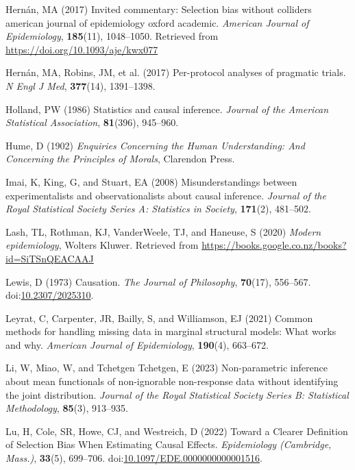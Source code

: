 \documentclass[
  single column]{article}
\newlength{\cslhangindent}
\newenvironment{CSLReferences}[2] %
 {\begin{list}{}{%
  \setlength{\itemindent}{0pt}
  \setlength{\leftmargin}{0pt}
  \setlength{\parsep}{0pt}
  \ifodd #1
   \setlength{\leftmargin}{\cslhangindent}
   \setlength{\itemindent}{-1\cslhangindent}
  \fi
  \setlength{\itemsep}{#2\baselineskip}}}
 {\end{list}}
\begin{document}
\begin{CSLReferences}{1}{0}
Hernán, MA (2017) Invited commentary: Selection bias without colliders
\textbar{} american journal of epidemiology \textbar{} oxford academic.
\emph{American Journal of Epidemiology}, \textbf{185}(11), 1048--1050.
Retrieved from \url{https://doi.org/10.1093/aje/kwx077}

Hernán, MA, Robins, JM, et al. (2017) Per-protocol analyses of pragmatic
trials. \emph{N Engl J Med}, \textbf{377}(14), 1391--1398.

Holland, PW (1986) Statistics and causal inference. \emph{Journal of the
American Statistical Association}, \textbf{81}(396), 945--960.

Hume, D (1902) \emph{Enquiries Concerning the Human Understanding: And
Concerning the Principles of Morals}, Clarendon Press.

Imai, K, King, G, and Stuart, EA (2008) Misunderstandings between
experimentalists and observationalists about causal inference.
\emph{Journal of the Royal Statistical Society Series A: Statistics in
Society}, \textbf{171}(2), 481--502.

Lash, TL, Rothman, KJ, VanderWeele, TJ, and Haneuse, S (2020)
\emph{Modern epidemiology}, Wolters Kluwer. Retrieved from
\url{https://books.google.co.nz/books?id=SiTSnQEACAAJ}

Lewis, D (1973) Causation. \emph{The Journal of Philosophy},
\textbf{70}(17), 556--567.
doi:\href{https://doi.org/10.2307/2025310}{10.2307/2025310}.

Leyrat, C, Carpenter, JR, Bailly, S, and Williamson, EJ (2021) Common
methods for handling missing data in marginal structural models: What
works and why. \emph{American Journal of Epidemiology}, \textbf{190}(4),
663--672.

Li, W, Miao, W, and Tchetgen Tchetgen, E (2023) Non-parametric inference
about mean functionals of non-ignorable non-response data without
identifying the joint distribution. \emph{Journal of the Royal
Statistical Society Series B: Statistical Methodology}, \textbf{85}(3),
913--935.

Lu, H, Cole, SR, Howe, CJ, and Westreich, D (2022) Toward a Clearer
Definition of Selection Bias When Estimating Causal Effects.
\emph{Epidemiology (Cambridge, Mass.)}, \textbf{33}(5), 699--706.
doi:\href{https://doi.org/10.1097/EDE.0000000000001516}{10.1097/EDE.0000000000001516}.


\end{CSLReferences}
\end{document}
